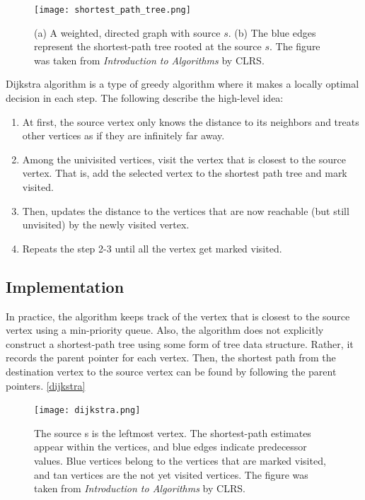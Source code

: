 \documentclass{article}
\begin{document}
\begin{figure} 
\centering
\texttt{[image: shortest\_path\_tree.png]}
\caption{(a) A weighted, directed graph with source $s$. (b) The blue edges represent the shortest-path tree rooted at the source $s$. The figure was taken from \textit{Introduction to Algorithms} by CLRS\cite{CLRS}.} 
\label{shortest_path_tree}
\end{figure}

Dijkstra algorithm is a type of greedy algorithm where it makes a locally optimal decision in each step. The following describe the high-level idea:

\begin{enumerate}
    \item At first, the source vertex only knows the distance to its neighbors and treats other vertices as if they are infinitely far away. 
    \item Among the univisited vertices, visit the vertex that is closest to the source vertex. That is, add the selected vertex to the shortest path tree and mark visited.
    \item Then, updates the distance to the vertices that are now reachable (but still unvisited) by the newly visited vertex. 
    \item Repeats the step 2-3 until all the vertex get marked visited.
\end{enumerate}


\subsection{Implementation}
In practice, the algorithm keeps track of the vertex that is closest to the source vertex using a min-priority queue. Also, the algorithm does not explicitly construct a shortest-path tree using some form of tree data structure. Rather, it records the parent pointer for each vertex. Then, the shortest path from the destination vertex to the source vertex can be found by following the parent pointers.
\autoref{dijkstra}

\begin{figure}
\centering
\texttt{[image: dijkstra.png]}
\caption{The source s is the leftmost vertex. The shortest-path estimates appear within the vertices, and blue edges indicate predecessor values. Blue vertices belong to the vertices that are marked visited, and tan vertices are the not yet visited vertices. The figure was taken from \textit{Introduction to Algorithms} by CLRS\cite{CLRS}.}
\label{dijkstra}
\end{figure}
\end{document}
